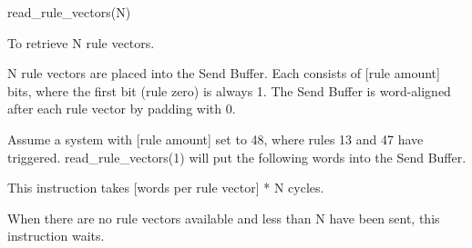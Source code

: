 

\format
read\_rule\_vectors(N)

\purpose

To retrieve N rule vectors.

\description

N rule vectors are placed into the Send Buffer.
Each consists of [rule amount] bits, where the first bit (rule zero) is always 1.
The Send Buffer is word-aligned after each rule vector by padding with 0.

\example

Assume a system with [rule amount] set to 48, where rules 13 and 47 have triggered.
read\_rule\_vectors(1) will put the following words into the Send Buffer.


\notes

This instruction takes [words per rule vector] * N cycles.

When there are no rule vectors available and less than N have been sent, this instruction waits.
